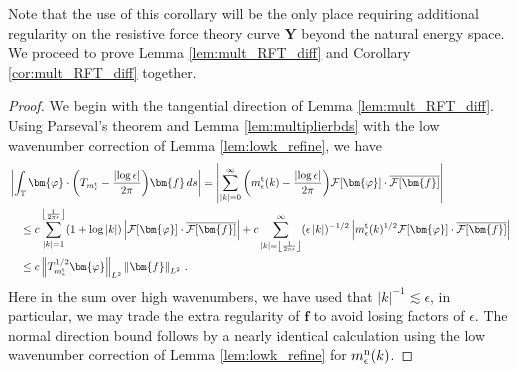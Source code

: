 \documentclass[11pt,reqno]{amsart}
\newcommand{\T}{\mathbb{T}}
\newcommand{\Y}{\bm{Y}}
\newcommand{\abs}[1]{\left\lvert #1 \right\rvert}
\newcommand{\norm}[1]{\left\lVert #1 \right\rVert}
\newcommand{\floor}[1]{\left\lfloor #1 \right\rfloor}
\newcommand{\mc}[1]{\mathcal{#1}}
\numberwithin{equation}{section}
\theoremstyle{definition}
\begin{document}
%
%
Note that the use of this corollary will be the only place requiring additional regularity on the resistive force theory curve $\Y$ beyond the natural energy space. 
%
We proceed to prove Lemma \ref{lem:mult_RFT_diff} and Corollary \ref{cor:mult_RFT_diff} together.
%
%
\begin{proof}
We begin with the tangential direction of Lemma \ref{lem:mult_RFT_diff}. Using Parseval's theorem and Lemma \ref{lem:multiplierbds} with the low wavenumber correction of Lemma \ref{lem:lowk_refine}, we have
\begin{equation}
\begin{aligned}
    &\abs{\int_\T\bm{\varphi}\cdot\bigg(T_{m_\epsilon^{\rm t}}-\frac{\abs{\log\epsilon}}{2\pi}\bigg)\bm{f}\,ds}
    =\abs{\sum_{\abs{k}=0}^\infty \bigg(m_\epsilon^{\rm t}(k)-\frac{\abs{\log\epsilon}}{2\pi}\bigg)\mc{F}[\bm{\varphi}]\cdot\overline{\mc{F}[\bm{f}]} }\\
    &\quad \le c\sum_{\abs{k}=1}^{\floor{\frac{1}{2\pi\epsilon}}}(1+\log\abs{k}) \abs{\mc{F}[\bm{\varphi}]\cdot\overline{\mc{F}[\bm{f}]}} + c\sum_{\abs{k}=\floor{\frac{1}{2\pi\epsilon}}}^\infty (\epsilon \abs{k})^{-1/2}\abs{m_\epsilon^{\rm t}(k)^{1/2}\mc{F}[\bm{\varphi}]\cdot\overline{\mc{F}[\bm{f}]}} \\
    &\quad \le c\norm{T_{m_\epsilon^{\rm t}}^{1/2}\bm{\varphi}}_{L^2}\norm{\bm{f}}_{L^2}\,.
\end{aligned}
\end{equation}
Here in the sum over high wavenumbers, we have used that $\abs{k}^{-1}\lesssim\epsilon$, in particular, we may trade the extra regularity of $\bm{f}$ to avoid losing factors of $\epsilon$. 
The normal direction bound follows by a nearly identical calculation using the low wavenumber correction of Lemma \ref{lem:lowk_refine} for $m_\epsilon^{\rm n}(k)$. 



\end{proof}
\end{document}
